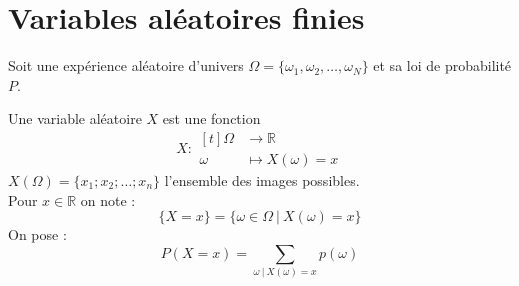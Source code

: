 \documentclass[main.tex]{subfiles}
\begin{document}
 
\newpage 
{}  
\pagestyle{scrheadings} %
\onehalfspacing 
\setcounter{chapter}{6}

\chapter{Variables aléatoires finies}
Soit une expérience aléatoire d'univers $\Omega=\{ \omega_1, \omega_2, \ldots , \omega_N\}$  et sa   loi de probabilité $P$.

\begin{definition} Une variable aléatoire $X$ est une fonction 
	\setlength{\abovedisplayskip}{3pt}
	\setlength{\belowdisplayskip}{3pt}  
$$X\colon \begin{aligned}[t] \Omega &\to \mathbb{R}\\
		\omega & \mapsto X(\omega)=x
	\end{aligned}$$
 $X(\Omega)=\{x_1; x_2; \ldots ; x_n\}$  l'ensemble des images possibles.\\
Pour $x\in\mathbb{R}$ on note : 
\setlength{\abovedisplayskip}{3pt}
\setlength{\belowdisplayskip}{3pt}  
$$\{X=x\}=\{\omega\in\Omega ~|~ X(\omega)=x\}$$ 
On pose :
\setlength{\abovedisplayskip}{3pt}
\setlength{\belowdisplayskip}{3pt}  
$$
P(X=x)= \sum_{\omega ~|~ X(\omega)=x} p(\omega) 
$$
\end{definition}  
\end{document}
